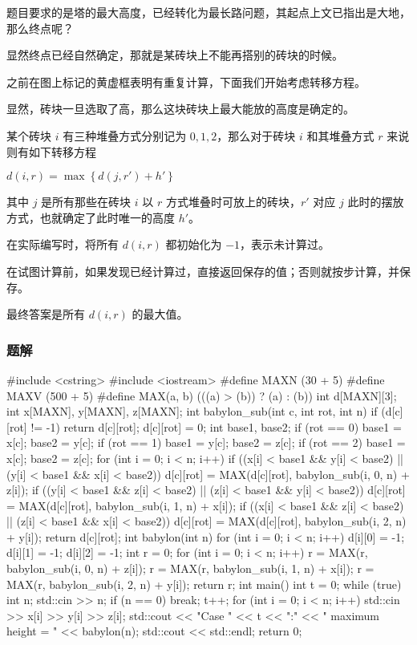 题目要求的是塔的最大高度，已经转化为最长路问题，其起点上文已指出是大地，那么终点呢？

显然终点已经自然确定，那就是某砖块上不能再搭别的砖块的时候。

之前在图上标记的黄虚框表明有重复计算，下面我们开始考虑转移方程。

显然，砖块一旦选取了高，那么这块砖块上最大能放的高度是确定的。

某个砖块 $i$ 有三种堆叠方式分别记为 $0, 1, 2$，那么对于砖块 $i$ 和其堆叠方式 $r$ 来说则有如下转移方程

$d(i, r) = \max\left\{d(j, r') + h'\right\}$

其中 $j$ 是所有那些在砖块 $i$ 以 $r$ 方式堆叠时可放上的砖块，$r'$ 对应 $j$ 此时的摆放方式，也就确定了此时唯一的高度 $h'$。

在实际编写时，将所有 $d(i, r)$ 都初始化为 $-1$，表示未计算过。

在试图计算前，如果发现已经计算过，直接返回保存的值；否则就按步计算，并保存。

最终答案是所有 $d(i, r)$ 的最大值。

\subsubsection{题解}

\begin{cppcode}
#include <cstring>
#include <iostream>
#define MAXN (30 + 5)
#define MAXV (500 + 5)
#define MAX(a, b) (((a) > (b)) ? (a) : (b))
int d[MAXN][3];
int x[MAXN], y[MAXN], z[MAXN];
int babylon_sub(int c, int rot, int n) {
  if (d[c][rot] != -1) {
    return d[c][rot];
  }
  d[c][rot] = 0;
  int base1, base2;
  if (rot == 0) {
    base1 = x[c];
    base2 = y[c];
  }
  if (rot == 1) {
    base1 = y[c];
    base2 = z[c];
  }
  if (rot == 2) {
    base1 = x[c];
    base2 = z[c];
  }
  for (int i = 0; i < n; i++) {
    if ((x[i] < base1 && y[i] < base2) || (y[i] < base1 && x[i] < base2))
      d[c][rot] = MAX(d[c][rot], babylon_sub(i, 0, n) + z[i]);
    if ((y[i] < base1 && z[i] < base2) || (z[i] < base1 && y[i] < base2))
      d[c][rot] = MAX(d[c][rot], babylon_sub(i, 1, n) + x[i]);
    if ((x[i] < base1 && z[i] < base2) || (z[i] < base1 && x[i] < base2))
      d[c][rot] = MAX(d[c][rot], babylon_sub(i, 2, n) + y[i]);
  }
  return d[c][rot];
}
int babylon(int n) {
  for (int i = 0; i < n; i++) {
    d[i][0] = -1;
    d[i][1] = -1;
    d[i][2] = -1;
  }
  int r = 0;
  for (int i = 0; i < n; i++) {
    r = MAX(r, babylon_sub(i, 0, n) + z[i]);
    r = MAX(r, babylon_sub(i, 1, n) + x[i]);
    r = MAX(r, babylon_sub(i, 2, n) + y[i]);
  }
  return r;
}
int main() {
  int t = 0;
  while (true) {
    int n;
    std::cin >> n;
    if (n == 0) break;
    t++;
    for (int i = 0; i < n; i++) {
      std::cin >> x[i] >> y[i] >> z[i];
    }
    std::cout << "Case " << t << ":"
              << " maximum height = " << babylon(n);
    std::cout << std::endl;
  }
  return 0;
}
\end{cppcode}
